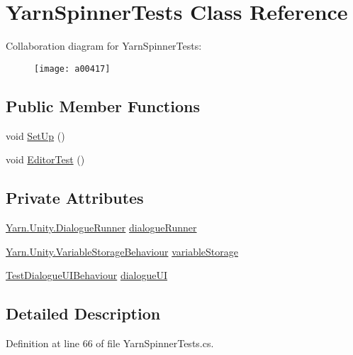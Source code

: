 \hypertarget{a00198}{\section{Yarn\-Spinner\-Tests Class Reference}
\label{a00198}
}


Collaboration diagram for Yarn\-Spinner\-Tests\-:
\nopagebreak
\begin{figure}[H]
\begin{center}
\leavevmode
\texttt{[image: a00417]}
\end{center}
\end{figure}
\subsection*{Public Member Functions}
\begin{DoxyCompactItemize}
\item 
void \hyperlink{a00198_ad6e4c6a92bb5ed6187949264df6aaf1b}{Set\-Up} ()
\item 
void \hyperlink{a00198_a60ab8ed8dc30ec30e74baa1916d47324}{Editor\-Test} ()
\end{DoxyCompactItemize}
\subsection*{Private Attributes}
\begin{DoxyCompactItemize}
\item 
\hyperlink{a00093}{Yarn.\-Unity.\-Dialogue\-Runner} \hyperlink{a00198_a9791840e0b5987e5bd09bce83ce2d8d9}{dialogue\-Runner}
\item 
\hyperlink{a00191}{Yarn.\-Unity.\-Variable\-Storage\-Behaviour} \hyperlink{a00198_a27dbc8c3f7f23ce142d1d5d1fd3df8bc}{variable\-Storage}
\item 
\hyperlink{a00171}{Test\-Dialogue\-U\-I\-Behaviour} \hyperlink{a00198_aace025d2a9a703154a1989c47b0a0737}{dialogue\-U\-I}
\end{DoxyCompactItemize}


\subsection{Detailed Description}


Definition at line 66 of file Yarn\-Spinner\-Tests.\-cs.



